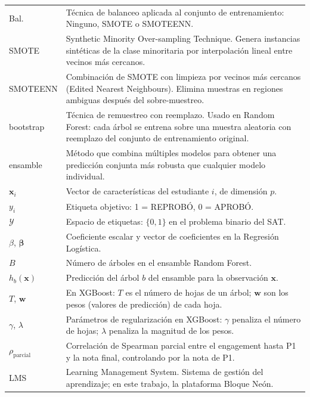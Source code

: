 \documentclass[12pt, letterpaper, openany]{report}
\begin{document}
\begin{longtable}{p{3.6cm} p{10.2cm}}
  Bal. & Técnica de balanceo aplicada al conjunto de entrenamiento: Ninguno, SMOTE o SMOTEENN. \\[4pt]

  SMOTE & Synthetic Minority Over-sampling Technique. Genera instancias sintéticas de la clase minoritaria por interpolación lineal entre vecinos más cercanos. \\[4pt]

  SMOTEENN & Combinación de SMOTE con limpieza por vecinos más cercanos (Edited Nearest Neighbours). Elimina muestras en regiones ambiguas después del sobre-muestreo. \\[4pt]

  bootstrap & Técnica de remuestreo con reemplazo. Usado en Random Forest: cada árbol se entrena sobre una muestra aleatoria con reemplazo del conjunto de entrenamiento original. \\[4pt]

  ensamble & Método que combina múltiples modelos para obtener una predicción conjunta más robusta que cualquier modelo individual. \\[4pt]

  $\mathbf{x}_i$ & Vector de características del estudiante $i$, de dimensión $p$. \\[4pt]

  $y_i$ & Etiqueta objetivo: 1 = REPROBÓ, 0 = APROBÓ. \\[4pt]

  $\mathcal{Y}$ & Espacio de etiquetas: $\{0,1\}$ en el problema binario del SAT. \\[4pt]

  $\beta$, $\boldsymbol{\beta}$ & Coeficiente escalar y vector de coeficientes en la Regresión Logística. \\[4pt]

  $B$ & Número de árboles en el ensamble Random Forest. \\[4pt]

  $h_b(\mathbf{x})$ & Predicción del árbol $b$ del ensamble para la observación $\mathbf{x}$. \\[4pt]

  $T$, $\mathbf{w}$ & En XGBoost: $T$ es el número de hojas de un árbol; $\mathbf{w}$ son los pesos (valores de predicción) de cada hoja. \\[4pt]

  $\gamma$, $\lambda$ & Parámetros de regularización en XGBoost: $\gamma$ penaliza el número de hojas; $\lambda$ penaliza la magnitud de los pesos. \\[4pt]

  $\rho_\text{parcial}$ & Correlación de Spearman parcial entre el engagement hasta P1 y la nota final, controlando por la nota de P1. \\[4pt]

  LMS & Learning Management System. Sistema de gestión del aprendizaje; en este trabajo, la plataforma Bloque Neón. \\[4pt]

\end{longtable}
\end{document}
